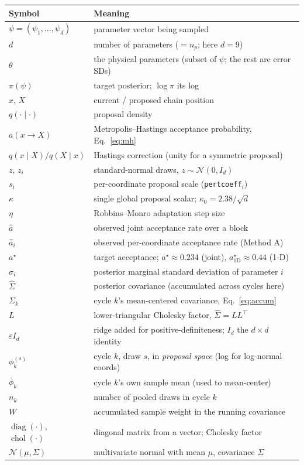 \documentclass[11pt]{article}
\newcommand{\code}[1]{\texttt{\small #1}}
\begin{document}
\begin{center}
\begin{tabular}{@{}ll@{}}
\toprule
Symbol & Meaning\\
\midrule
$\psi=(\psi_1,\dots,\psi_d)$ & parameter vector being sampled\\
$d$ & number of parameters ($=n_p$; here $d=9$)\\
$\theta$ & the physical parameters (subset of $\psi$; the rest are error SDs)\\
$\pi(\psi)$ & target posterior; $\log\pi$ its log\\
$x,\,X$ & current / proposed chain position\\
$q(\cdot\mid\cdot)$ & proposal density\\
$a(x\to X)$ & Metropolis--Hastings acceptance probability, Eq.~\eqref{eq:mh}\\
$q(x\mid X)/q(X\mid x)$ & Hastings correction (unity for a symmetric proposal)\\
$z,\,z_i$ & standard-normal draws, $z\sim\mathcal N(0,I_d)$\\
$s_i$ & per-coordinate proposal scale (\code{pertcoeff}$_i$)\\
$\kappa$ & single global proposal scalar; $\kappa_0=2.38/\sqrt d$\\
$\eta$ & Robbins--Monro adaptation step size\\
$\hat a$ & observed joint acceptance rate over a block\\
$\hat a_i$ & observed per-coordinate acceptance rate (Method A)\\
$a^\star$ & target acceptance; $a^\star\!\approx\!0.234$ (joint), $a^\star_{1\mathrm D}\!\approx\!0.44$ (1-D)\\
$\hat\sigma_i$ & posterior marginal standard deviation of parameter $i$\\
$\hat\Sigma$ & posterior covariance (accumulated across cycles here)\\
$\Sigma_k$ & cycle $k$'s mean-centered covariance, Eq.~\eqref{eq:accum}\\
$L$ & lower-triangular Cholesky factor, $\hat\Sigma=LL^{\!\top}$\\
$\varepsilon I_d$ & ridge added for positive-definiteness; $I_d$ the $d\times d$ identity\\
$\phi_k^{(s)}$ & cycle $k$, draw $s$, in \emph{proposal space} (log for log-normal coords)\\
$\bar\phi_k$ & cycle $k$'s own sample mean (used to mean-center)\\
$n_k$ & number of pooled draws in cycle $k$\\
$W$ & accumulated sample weight in the running covariance\\
$\operatorname{diag}(\cdot)$, $\operatorname{chol}(\cdot)$ & diagonal matrix from a vector; Cholesky factor\\
$\mathcal N(\mu,\Sigma)$ & multivariate normal with mean $\mu$, covariance $\Sigma$\\
\bottomrule
\end{tabular}
\end{center}
\end{document}
